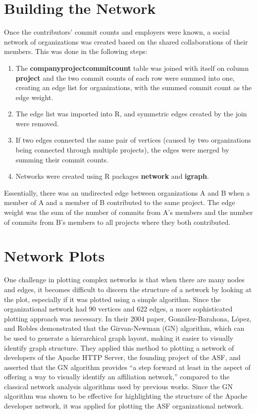 \section{Building the Network}
Once the contributors' commit counts and employers were known, a social network of organizations was created based on the shared collaborations of their members. This was done in the following steps:
\begin{enumerate}
	\item The \textbf{companyprojectcommitcount} table was joined with itself on column \textbf{project} and the two commit counts of each row were summed into one, creating an edge list for organizations, with the summed commit count as the edge weight.
	\item The edge list was imported into R, and symmetric edges created by the join were removed.
	\item If two edges connected the same pair of vertices (caused by two organizations being connected through multiple projects), the edges were merged by summing their commit counts. 
	\item Networks were created using R packages \textbf{network} and \textbf{igraph}.
\end{enumerate}
Essentially, there was an undirected edge between organizations A and B when a member of A and a member of B contributed to the same project. The edge weight was the sum of the number of commits from A's members and the number of commits from B's members to all projects where they both contributed.

\section{Network Plots}
One challenge in plotting complex networks is that when there are many nodes and edges, it becomes difficult to discern the structure of a network by looking at the plot, especially if it was plotted using a simple algorithm. Since the organizational network had 90 vertices and 622 edges, a more sophisticated plotting approach was necessary. In their 2004 paper\cite{gonzalez2004community}, Gonz{\'a}lez-Barahona, L{\'o}pez, and Robles demonstrated that the Girvan-Newman (GN) algorithm, which can be used to generate a hierarchical graph layout, making it easier to visually identify graph structure. They applied this method to plotting a network of developers of the Apache HTTP Server, the founding project of the ASF, and asserted that the GN algorithm provides ``a step forward at least in the aspect of offering a way to visually identify an affiliation network,'' compared to the classical network analysis algorithms used by previous works. Since the GN algorithm was shown to be effective for highlighting the structure of the Apache developer network, it was applied for plotting the ASF organizational network.

